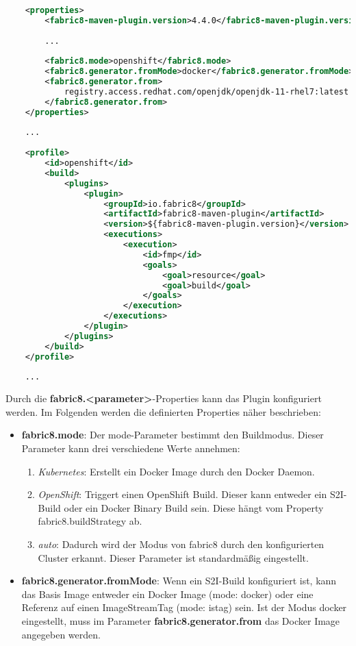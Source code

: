 \begin{lstlisting}[language=xml, caption=pom.xml - fabric8-maven-plugin, label=properties]
	
	<properties>
		<fabric8-maven-plugin.version>4.4.0</fabric8-maven-plugin.version>
		
		...
		
		<fabric8.mode>openshift</fabric8.mode>
		<fabric8.generator.fromMode>docker</fabric8.generator.fromMode>
		<fabric8.generator.from>
			registry.access.redhat.com/openjdk/openjdk-11-rhel7:latest
		</fabric8.generator.from>
	</properties>
	
	...
	
	<profile>
		<id>openshift</id>
		<build>
			<plugins>
				<plugin>
					<groupId>io.fabric8</groupId>
					<artifactId>fabric8-maven-plugin</artifactId>
					<version>${fabric8-maven-plugin.version}</version>
					<executions>
						<execution>
							<id>fmp</id>
							<goals>
								<goal>resource</goal>
								<goal>build</goal>
							</goals>
						</execution>
					</executions>
				</plugin>
			</plugins>
		</build>
	</profile>
	
	...
\end{lstlisting}

Durch die \textbf{fabric8.<parameter>}-Properties kann das Plugin konfiguriert werden.
Im Folgenden werden die definierten Properties näher beschrieben:

\begin{itemize}
	\item \textbf{fabric8.mode}: Der mode-Parameter bestimmt den Buildmodus. Dieser Parameter kann drei verschiedene Werte annehmen:
	\begin{enumerate}
		\item \textit{Kubernetes}: Erstellt ein Docker Image durch den Docker Daemon.
		\item \textit{OpenShift}: Triggert einen OpenShift Build. Dieser kann entweder ein S2I-Build oder ein Docker Binary Build sein. Diese hängt vom Property fabric8.buildStrategy ab.
		\item \textit{auto}: Dadurch wird der Modus von fabric8 durch den konfigurierten Cluster erkannt. Dieser Parameter ist standardmäßig eingestellt.
	\end{enumerate}
	\item \textbf{fabric8.generator.fromMode}: Wenn ein S2I-Build konfiguriert ist, kann das Basis Image entweder ein Docker Image (mode: docker) oder eine Referenz auf einen ImageStreamTag (mode: istag) sein. Ist der Modus docker eingestellt, muss im Parameter \textbf{fabric8.generator.from} das Docker Image angegeben werden. 
\end{itemize}

